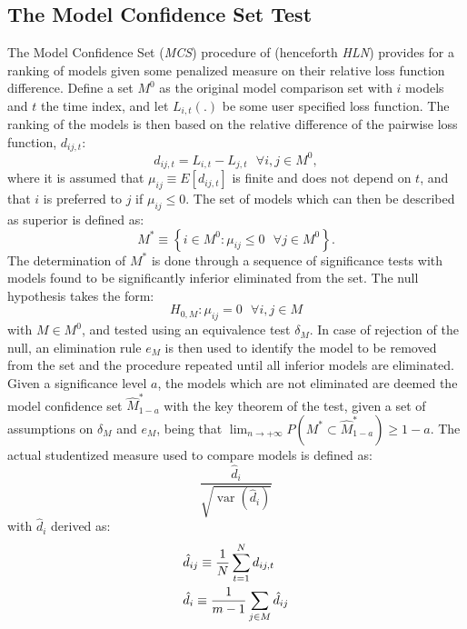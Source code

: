\subsection{The Model Confidence Set Test}
The Model Confidence Set (\emph{MCS}) procedure of \cite{Hansen2011} (henceforth \emph{HLN}) provides 
for a ranking of models given some penalized measure on their relative loss function difference. Define a 
set $M^0$ as the original model comparison set with $i$ models and $t$ the time index, and let $L_{i,t}\left(.\right)$ be 
some user specified loss function. The ranking of the models is then based on the relative difference of the 
pairwise loss function, $d_{ij,t}$:
\begin{equation}\label{mcs1}
{d_{ij,t}} = {L_{i,t}} - {L_{j,t}}{\text{  }}\forall i,j \in {M^0},
\end{equation}
where it is assumed that ${\mu _{ij}} \equiv E\left[ {{d_{ij,t}}} \right]$ is finite and does not depend on $t$, and 
that $i$ is preferred to $j$ if $\mu_{ij}\le 0$. The set of models which can then be described as superior is defined as:
\begin{equation}\label{mcs2}
{M^*} \equiv \left\{ {i \in {M^0}:{\mu _{ij}} \leqslant 0{\text{  }}\forall j \in {M^0}} \right\}.
\end{equation}
The determination of $M^*$ is done through a sequence of significance tests with models found to be significantly inferior 
eliminated from the set. The null hypothesis takes the form:
\begin{equation}\label{mcs3}
{H_{0,M}}:{\mu _{ij}} = 0{\text{ }}\forall i,j \in M
\end{equation}
with $M \in M^0$, and tested using an equivalence test $\delta_M$. In case of rejection of the null, an elimination 
rule $e_M$ is then used to identify the model to be removed from the set and the procedure repeated until all inferior 
models are eliminated. Given a significance level $a$, the models which are not eliminated are deemed the model confidence 
set $\hat M_{1 - a}^*$ with the key theorem of the test, given a set of assumptions on $\delta_M$ and $e_M$, being 
that $\lim_{n \to +\infty}P\left( {{M^*} \subset \hat M_{1 - a}^*} \right) \geqslant 1 - a$. The actual studentized measure 
used to compare models is defined as:
\begin{equation}\label{msc4}
\frac{{{{\hat d}_i}}}
{{\sqrt {\operatorname{var} \left( {{{\hat d}_i}} \right)} }}
\end{equation}
with $\hat d_i$ derived as:
\begin{equation}\label{mcs5}
\begin{gathered}
  {{\hat d}_{ij}} \equiv \frac{1}
{N}\sum\limits_{t = 1}^N {{d_{ij,t}}}  \hfill \\
  {{\hat d}_i} \equiv \frac{1}
{{m - 1}}\sum\limits_{j \in M} {{{\hat d}_{ij}}}  \hfill \\
\end{gathered}
\end{equation}

